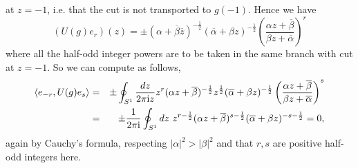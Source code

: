 \documentclass[10pt,a4paper]{article}
\begin{document}
\begin{appendix}
at $z=-1$, i.e. that the cut is not transported
to $g(-1)$. Hence we have
\[ (U(g)e_r)(z)= \pm(\alpha
+\overline{\beta}\overline{z})^{-\frac{1}{2}}
(\overline{\alpha}+\beta z
)^{-\frac{1}{2}} \left( \frac{\alpha z +
\overline{\beta}}{\beta z + \overline{\alpha}}
\right)^r \]
where all the half-odd integer powers are to be
taken in the same branch with cut at
$z=-1$. So we can compute as follows,
\begin{eqnarray*}
\langle e_{-r}, U(g) e_s \rangle &=& \pm
\oint_{S^1} \frac{dz}{2\pi{\rm i} z} z^r
(\alpha z+\overline{\beta})^{-\frac{1}{2}}
z^\frac{1}{2}(\overline{\alpha}+\beta z
)^{-\frac{1}{2}} \left( \frac{\alpha z +
\overline{\beta}}{\beta z + \overline{\alpha}}
\right)^s \\
&=& \pm\frac{1}{2\pi{\rm i}} \oint_{S^1} dz \,\,
z^{r-\frac{1}{2}} (\alpha z +\overline{\beta}
)^{s-\frac{1}{2}} (\overline{\alpha} +
\beta z)^{-s-\frac{1}{2}} = 0,
\end{eqnarray*}
again by Cauchy's formula, respecting
$|\alpha|^2>|\beta|^2$ and that $r,s$ are
positive half-odd integers here.


\end{appendix}
\end{document}
